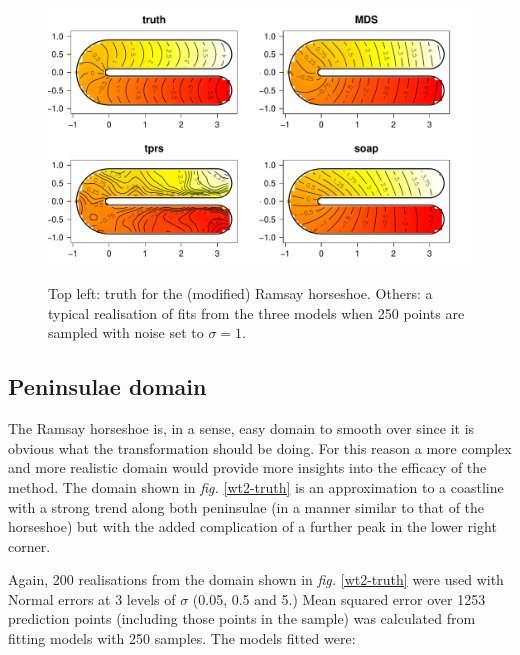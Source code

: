 \documentclass[a4paper,10pt]{article}
\newcommand{\fig}[1]{\emph{fig.} \ref{#1}}
\begin{document}
\begin{figure}
\centering
\includegraphics[width=6in]{figs/ramsay-fit-1.pdf} \\
\caption{Top left: truth for the (modified) Ramsay horseshoe. Others: a typical realisation of fits from the three models when 250 points are sampled with noise set to $\sigma=1$.}
\label{ramsay-fit-1}
\end{figure}

\subsection{Peninsulae domain}

The Ramsay horseshoe is, in a sense, easy domain to smooth over since it is obvious what the transformation should be doing. For this reason a more complex and more realistic domain would provide more insights into the efficacy of the method. The domain shown in \fig{wt2-truth} is an approximation to a coastline with a strong trend along both peninsulae (in a manner similar to that of the horseshoe) but with the added complication of a further peak in the lower right corner.

Again, 200 realisations from the domain shown in \fig{wt2-truth} were used with Normal errors at 3 levels of $\sigma$ (0.05, 0.5 and 5.) Mean squared error over 1253 prediction points (including those points in the sample) was calculated from fitting models with 250 samples. The models fitted were:
\end{document}
